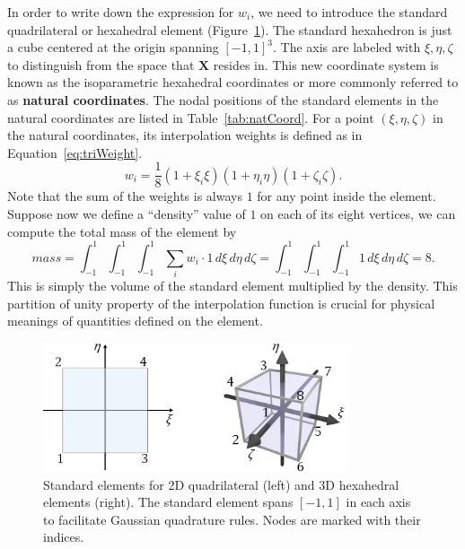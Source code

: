 In order to write down the expression for $w_i$, we need to introduce the standard quadrilateral or hexahedral element (Figure~\ref{fig:standardEle}).
The standard hexahedron is just a cube centered at the origin spanning $[-1,1]^3$.
The axis are labeled with $\xi, \eta, \zeta$ to distinguish from the space that $\mathbf{X}$ resides in.
This new coordinate system is known as the isoparametric hexahedral coordinates or more commonly referred to as \textbf{natural coordinates}.
The nodal positions of the standard elements in the natural coordinates are listed in Table~\ref{tab:natCoord}.
For a point $(\xi, \eta,\zeta)$ in the natural coordinates,
its interpolation weights is defined as in Equation~\ref{eq:triWeight}.
\begin{equation}
	w_i=\frac{1}{8}(1+\xi_i\xi)(1+\eta_i\eta)(1+\zeta_i\zeta).
	\label{eq:triWeight}
\end{equation}
Note that the sum of the weights is always $1$ for any point inside the element.
Suppose now we define a ``density'' value of $1$ on each of its eight vertices,
we can compute the total mass of the element by 
\[
mass=\int_{-1}^{1}\int_{-1}^{1}\int_{-1}^{1}\sum_i w_i\cdot 1 \,d\xi \,d\eta\,d\zeta=
\int_{-1}^{1}\int_{-1}^{1}\int_{-1}^{1} 1 \,d\xi \,d\eta\,d\zeta=8.
\]
This is simply the volume of the standard element multiplied by the density.
This partition of unity property of the interpolation function is crucial for physical meanings of quantities defined on the element.
\begin{figure}
\centering
\includegraphics[width=0.8\textwidth]{figs/refEle.png}
\caption{Standard elements for 2D quadrilateral (left) 
	and 3D hexahedral elements (right). The standard element spans $[-1,1]$ in each axis
	to facilitate Gaussian quadrature rules. Nodes are marked with their indices.
	}
\label{fig:standardEle}
\end{figure}
